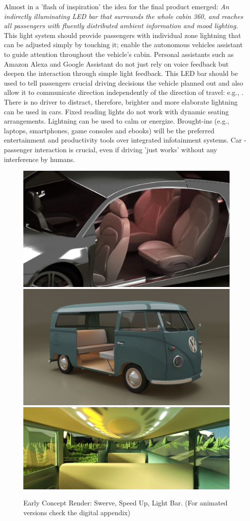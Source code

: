 Almost in a 'flash of inspiration' the idea for the final product emerged: \emph{An indirectly illuminating LED bar that surrounds the whole cabin 360, and reaches all passengers with fluently distributed ambient information and mood lighting.} This light system should provide passengers with individual zone lightning that can be adjusted simply by touching it; enable the autonomous vehicles assistant to guide attention throughout the vehicle's cabin. Personal assistants such as Amazon Alexa and Google Assistant do not just rely on voice feedback but deepen the interaction through simple light feedback. This LED bar should be used to tell passengers crucial driving decisions the vehicle planned out and also allow it to communicate direction independently of the direction of travel: e.g., .
There is no driver to distract, therefore, brighter and more elaborate lightning can be used in cars. Fixed reading lights do not work with dynamic seating arrangements. Lightning can be used to calm or energize. Brought-ins (e.g., laptops, smartphones, game consoles and ebooks) will be the preferred entertainment and productivity tools over integrated infotainment systems. Car - passenger interaction is crucial, even if driving 'just works' without any interference by humans. 

\begin{figure}
    \includegraphics[height=0.28\textwidth]{fig/swerve_Mittel.jpg}\hfill\includegraphics[height=0.28\textwidth]{fig/busLight_Mittel.jpg}\newline\includegraphics[width=1\textwidth]{fig/0013GRADIENTcut.jpg}
    \caption[Early Concept Render]{Early Concept Render: Swerve, Speed Up, Light Bar. (For animated versions check the digital appendix)}
    \label{fig:conceptrender}
\end{figure}

